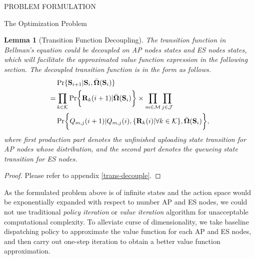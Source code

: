 \documentclass[10pt, conference, letterpaper]{IEEEtran}
\newtheorem{lemma}{Lemma}
\renewcommand{\vec}{\mathbf}
\DeclarePairedDelimiter{\set}{\{}{\}}
\DeclarePairedDelimiter{\Brace}{\bigg\{}{\bigg\}}
\newcommand{\apSet}{\mathcal{K}}
\newcommand{\esSet}{\mathcal{M}}
\newcommand{\jSpace}{\mathcal{J}}
\newcommand{\Stat}{\mathbf{S}}
\newcommand{\Policy}{\boldsymbol{\Omega}}
\newcommand{\BPolicy}{\bar{\Policy}}
\begin{document}
\begin{section}{PROBLEM FORMULATION}
\begin{subsection}{The Optimization Problem}
            \begin{lemma}[Transition Function Decoupling]
                The transition function in Bellman's equation could be decoupled on AP nodes states and ES nodes states, which will facilitate the approximated value function expression in the following section. The decoupled transition function is in the form as follows.
                \begin{align}
                    & \Pr\{\Stat_{i+1}|\Stat_{i}, \BPolicy(\Stat_{i})\}
                    \nonumber\\
                    =& \prod_{k\in\apSet} \Pr\Brace{\vec{R}_k(i+1)|\BPolicy(\Stat_{i})} \times \prod_{m\in\esSet}\prod_{j\in\jSpace}
                        \nonumber\\
                        & \Pr \Brace{Q_{m,j}(i+1)|Q_{m,j}(i), \set{\vec{R}_k(i)|\forall k\in\apSet}, \BPolicy(\Stat_{i})},
                \end{align}
                where first production part denotes the unfinished uploading state transition for AP nodes whose distribution, and the second part denotes the queueing state transition for ES nodes.
            \end{lemma}
            \begin{proof}
                Please refer to appendix \ref{trans-decouple}.
            \end{proof}

            As the formulated problem above is of infinite states and the action space would be exponentially expanded with respect to number AP and ES nodes, we could not use traditional \emph{policy iteration} or \emph{value iteration} algorithm \cite{sutton1998introduction} for unacceptable computational complexity. To alleviate curse of dimensionality, we take baseline dispatching policy to approximate the value function for each AP and ES nodes, and then carry out one-step iteration to obtain a better value function approximation.
        \end{subsection}
    \end{section}
\end{document}
